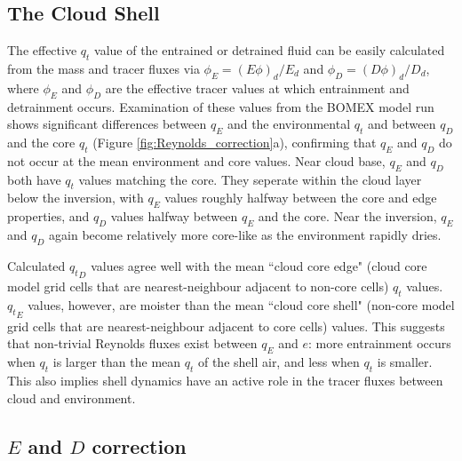 \documentclass[draft,grl]{agutex}
\begin{document}
\begin{article}

\section{The Cloud Shell}

The effective $q_t$ value of the entrained or detrained fluid can be easily 
calculated from the mass and tracer fluxes via $\phi_E = (E\phi)_d / E_d$ and 
$\phi_D = (D\phi)_d / D_d$, where $\phi_E$ and $\phi_D$ are the effective 
tracer values at which entrainment and detrainment occurs.  Examination of 
these values from the BOMEX model run shows significant differences between 
$q_E$ and the environmental $q_t$ and between $q_D$ and the core $q_t$ (Figure 
\ref{fig:Reynolds_correction}a), confirming that $q_E$ and $q_D$ do not occur 
at the mean environment and core values.  Near cloud base, $q_E$ and $q_D$ both 
have $q_t$ values matching the core.  They seperate within the cloud layer 
below the inversion, with $q_E$ values roughly halfway between the core and 
edge properties, and $q_D$ values halfway between $q_E$ and the core.  Near the 
inversion, $q_E$ and $q_D$ again become relatively more core-like as the 
environment rapidly dries.

Calculated ${q_t}_D$ values agree well with the mean ``cloud core edge" (cloud 
core model grid cells that are nearest-neighbour adjacent to non-core cells) 
$q_t$ values.  ${q_t}_E$ values, however, are moister than the mean ``cloud 
core shell" (non-core model grid cells that are nearest-neighbour adjacent to 
core cells) values.  This suggests that non-trivial Reynolds fluxes exist 
between $q_E$ and $e$: more entrainment occurs when $q_t$ is larger than the 
mean $q_t$ of the shell air, and less when $q_t$ is smaller.  This also implies 
shell dynamics have an active role in the tracer fluxes between cloud and 
environment.


\subsection{$E$ and $D$ correction}
  

\end{article}
\end{document}
